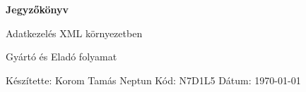 \documentclass[14pt]{extarticle}
\begin{document}
	\begin{titlepage}
    \centering
    \vspace*{\fill}

    \vspace*{0.5cm}

    \huge\bfseries
    Jegyzőkönyv

    \vspace*{0.5cm}
	
	\sffamily\mdseries
    \large Adatkezelés XML környezetben
    
    \vspace{0.3cm}
    
    \normalsize Gyártó és Eladó folyamat

    \vspace*{\fill}
    
    \raggedleft
    Készítette: Korom Tamás\linebreak
    Neptun Kód: N7D1L5\linebreak
    Dátum: \today
    \end{titlepage}
\end{document}
